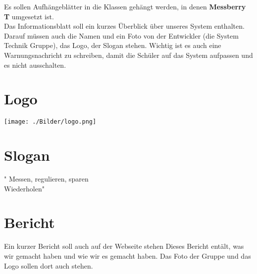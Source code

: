 Es sollen Aufh\"angebl\"atter in die Klassen geh\"angt werden, in denen \textbf{Messberry T} umgesetzt ist.\\
	Das Informationsblatt soll ein kurzes \"Uberblick \"uber unseres System enthalten.
	Darauf m\"ussen auch die Namen und ein Foto von der Entwickler (die System Technik Gruppe), 
	das Logo, der Slogan stehen.
	Wichtig ist es auch eine Warnungsnachricht zu schreiben, damit die Sch\"uler auf das System
	aufpassen und es nicht ausschalten. 
	\section{Logo}
				\texttt{[image: ./Bilder/logo.png]}
	\section{Slogan}
	" Messen, regulieren, sparen\\
		Wiederholen" 
	
	\section{Bericht}
	Ein kurzer Bericht soll auch auf der Webseite stehen
	Dieses Bericht ent\"alt, was wir gemacht haben und wie wir es gemacht haben. Das Foto der Gruppe und das Logo sollen dort auch stehen.